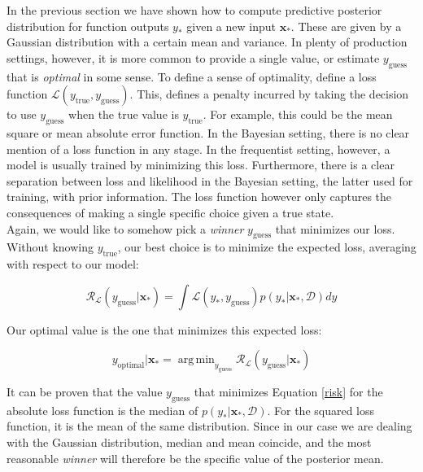 \documentclass[10pt,a4paper,twoside]{book}
\DeclareMathOperator*{\argmin}{arg\,min}
\begin{document}
In the previous section we have shown how to compute predictive posterior distribution for function outputs $y_*$ given a new input $\boldsymbol{x}_*$. These are given by a Gaussian distribution with a certain mean and variance. In plenty of production settings, however, it is more common to provide a single value, or estimate $y_{\mathrm{guess}}$ that is \textit{optimal} in some sense. To define a sense of optimality, define a loss function $\mathcal{L}(y_{\mathrm{true}}, y_{\mathrm{guess}})$. This, defines a penalty incurred by taking the decision to use $y_{\mathrm{guess}}$ when the true value is $y_{\mathrm{true}}$. For example, this could be the mean square or mean absolute error function. In the Bayesian setting, there is no clear mention of a loss function in any stage. In the frequentist setting, however, a model is usually trained by minimizing this loss. Furthermore, there is a clear separation between loss and likelihood in the Bayesian setting, the latter used for training, with prior information. The loss function however only captures the consequences of making a single specific choice given a true state.\\

Again, we would like to somehow pick a \textit{winner} $y_{\mathrm{guess}}$ that minimizes our loss. Without knowing $y_{\mathrm{true}}$, our best choice is to minimize the expected loss, averaging with respect to our model:

\begin{equation}
\mathcal{R}_{\mathcal{L}}(y_{\mathrm{guess}}|\boldsymbol{x}_*) = \int \mathcal{L}(y_{*}, y_{\mathrm{guess}})p(y_*|\boldsymbol{x}_*, \mathcal{D})dy
\end{equation}

Our optimal value is the one that minimizes this expected loss:

\begin{equation}
\label{risk}
y_{\mathrm{optimal}}|\boldsymbol{x}_* = \argmin_{y_{\mathrm{guess}}}\mathcal{R}_{\mathcal{L}}(y_{\mathrm{guess}}|\boldsymbol{x}_*)
\end{equation}

It can be proven that the value $y_{\mathrm{guess}}$ that minimizes Equation \ref{risk} for the absolute loss function is the median of $p(y_*|\boldsymbol{x}_*,\mathcal{D})$. For the squared loss function, it is the mean of the same distribution. Since in our case we are dealing with the Gaussian distribution, median and mean coincide, and the most reasonable \textit{winner} will therefore be the specific value of the posterior mean. 
\end{document}

